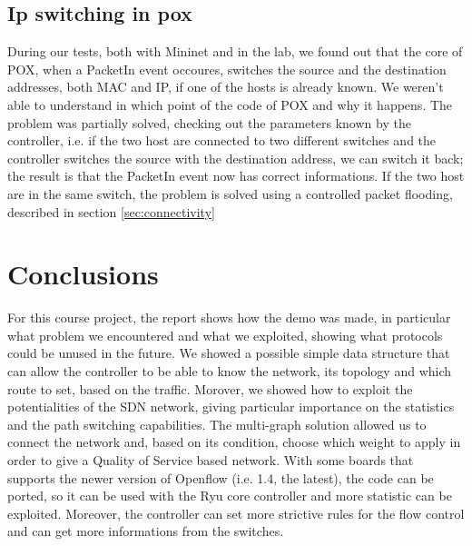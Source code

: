 \documentclass[conference,10pt]{IEEEtran}
\begin{document}
\subsection{Ip switching in pox}
During our tests, both with Mininet and in the lab, we found out that the core of POX, when a PacketIn event occoures, switches the source and the destination addresses,
both MAC and IP, if one of the hosts is already known. We weren't able to understand in which point of the code of POX  and why it happens.
The problem was partially solved, checking out the
parameters known by the controller, i.e. if the two host are connected to two different switches and the controller switches the source with the
destination address, we can switch it back; the result is that the PacketIn event now has correct informations.
If the two host are in the same switch, the problem is solved using a controlled packet flooding, described in section \ref{sec:connectivity}

\section{Conclusions}\label{sec:conclusion}
For this course project, the report shows how the demo was made, in particular what problem we encountered
and what we exploited, showing what protocols could be unused in the future. We showed a possible simple data structure
that can allow the controller to be able to know the network, its topology and which route to set, based on the traffic.
Morover, we showed how to exploit the potentialities of the SDN network, giving particular importance on the
statistics and the path switching capabilities.
The multi-graph solution allowed us to connect the network and, based on its condition, choose which weight to apply
in order to give a Quality of Service based network. With some boards that supports the newer version of Openflow
(i.e. 1.4, the latest), the code can be ported, so it can be used with the Ryu core controller and more statistic can
be exploited. Moreover, the controller can set more strictive rules for the flow control and can get more informations from the
switches.
\end{document}
